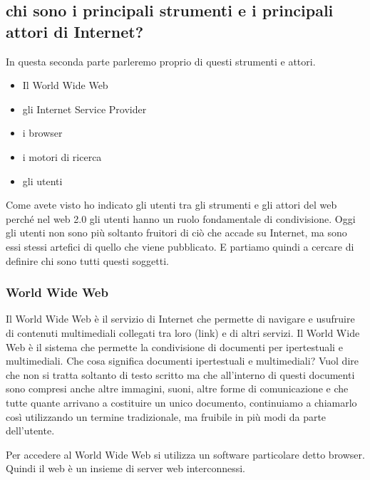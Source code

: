      \subsection{chi sono i principali strumenti e i principali attori di Internet?}
     
     In questa seconda parte parleremo proprio di questi strumenti e attori. \par
     \begin{itemize}
         \item Il World Wide Web 
         \item gli Internet Service Provider 
         \item i browser 
         \item i motori di ricerca 
         \item gli utenti 
     \end{itemize}
     
     Come avete visto ho indicato gli utenti tra gli strumenti e gli attori del web perché nel web 2.0 gli utenti hanno un ruolo fondamentale di condivisione. Oggi gli utenti non sono più soltanto fruitori di ciò che accade su Internet, ma sono essi stessi artefici di quello che viene pubblicato. E partiamo quindi a cercare di definire chi sono tutti questi soggetti. 
     \subsubsection{World Wide Web}
     Il  World Wide Web è il servizio di Internet che permette di navigare e usufruire di contenuti multimediali collegati tra loro (link) e di altri servizi. Il World Wide Web è il sistema che permette la condivisione di documenti per ipertestuali e multimediali. Che cosa significa documenti ipertestuali e multimediali? Vuol dire che non si tratta soltanto di testo scritto ma che all'interno di questi documenti sono compresi anche altre immagini, suoni, altre forme di comunicazione e che tutte quante arrivano a costituire un unico documento, continuiamo a chiamarlo così utilizzando un termine tradizionale, ma fruibile in più modi da parte dell'utente.\par
     
     Per accedere al World Wide Web si utilizza un software particolare detto browser. Quindi il web è un insieme di server web interconnessi. 
